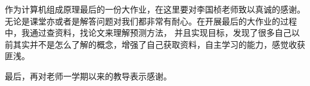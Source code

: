 
\acknowledgement
{}


作为计算机组成原理最后的一份大作业，在这里要对李国桢老师致以真诚的感谢。无论是课堂亦或者是解答问题对我们都非常有耐心。在开展最后的大作业的过程中，我通过查资料，找论文来理解预测方法，
并且实现目标，发现了很多自己以前其实并不是怎么了解的概念，增强了自己获取资料，自主学习的能力，感觉收获匪浅。\par
最后，再对老师一学期以来的教导表示感谢。











